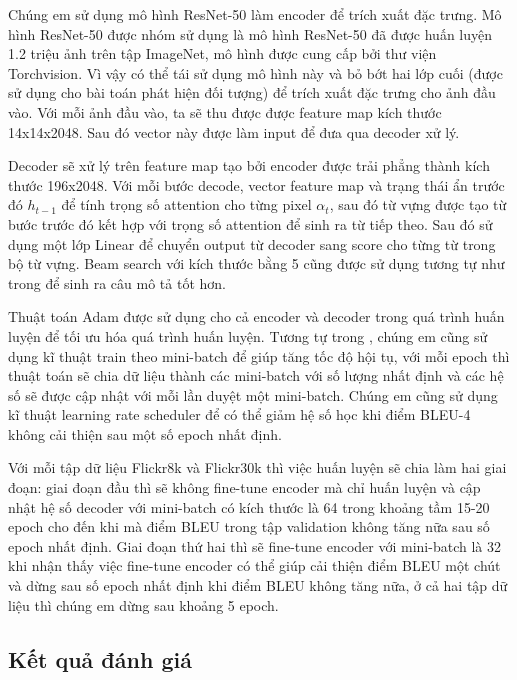 \documentclass[conference]{IEEEtran}
\begin{document}
Chúng em sử dụng mô hình ResNet-50 làm encoder để trích xuất đặc trưng. Mô hình ResNet-50 được nhóm sử dụng là mô hình ResNet-50 đã được huấn luyện 1.2 triệu ảnh trên tập ImageNet\cite{russakovsky2015imagenet}, mô hình được cung cấp bởi thư viện Torchvision. Vì vậy có thể tái sử dụng mô hình này và bỏ bớt hai lớp cuối (được sử dụng cho bài toán phát hiện đối tượng) để trích xuất đặc trưng cho ảnh đầu vào. Với mỗi ảnh đầu vào, ta sẽ thu được được feature map kích thước 14x14x2048. Sau đó vector này được làm input để đưa qua decoder xử lý.

Decoder sẽ xử lý trên feature map tạo bởi encoder được trải phẳng thành kích thước 196x2048. Với mỗi bước decode, vector feature map và trạng thái ẩn trước đó $h_{t-1}$ để tính trọng số attention cho từng pixel $\alpha_{t}$, sau đó từ vựng được tạo từ bước trước đó kết hợp với trọng số attention để sinh ra từ tiếp theo. Sau đó sử dụng một lớp Linear để chuyển output từ decoder sang score cho từng từ trong bộ từ vựng. Beam search với kích thước bằng 5 cũng được sử dụng tương tự như trong \cite{xu2015show} để sinh ra câu mô tả tốt hơn. 

Thuật toán Adam \cite{kingma2014adam} được sử dụng cho cả encoder và decoder trong quá trình huấn luyện để tối ưu hóa quá trình huấn luyện. Tương tự trong \cite{xu2015show}, chúng em cũng sử dụng kĩ thuật train theo mini-batch để giúp tăng tốc độ hội tụ, với mỗi epoch thì thuật toán sẽ chia dữ liệu thành các mini-batch với số lượng nhất định và các hệ số sẽ được cập nhật với mỗi lần duyệt một mini-batch. Chúng em cũng sử dụng kĩ thuật learning rate scheduler để có thể giảm hệ số học khi điểm BLEU-4 không cải thiện sau một số epoch nhất định. 

Với mỗi tập dữ liệu Flickr8k và Flickr30k thì việc huấn luyện sẽ chia làm hai giai đoạn: giai đoạn đầu thì sẽ không fine-tune encoder mà chỉ huấn luyện và cập nhật hệ số decoder với mini-batch có kích thước là 64 trong khoảng tầm 15-20 epoch cho đến khi mà điểm BLEU trong tập validation không tăng nữa sau số epoch nhất định. Giai đoạn thứ hai thì sẽ fine-tune encoder với mini-batch là 32 khi nhận thấy việc fine-tune encoder có thể giúp cải thiện điểm BLEU một chút và dừng sau số epoch nhất định khi điểm BLEU không tăng nữa, ở cả hai tập dữ liệu thì chúng em dừng sau khoảng 5 epoch. 

\subsection{Kết quả đánh giá\label{result}}
\end{document}
